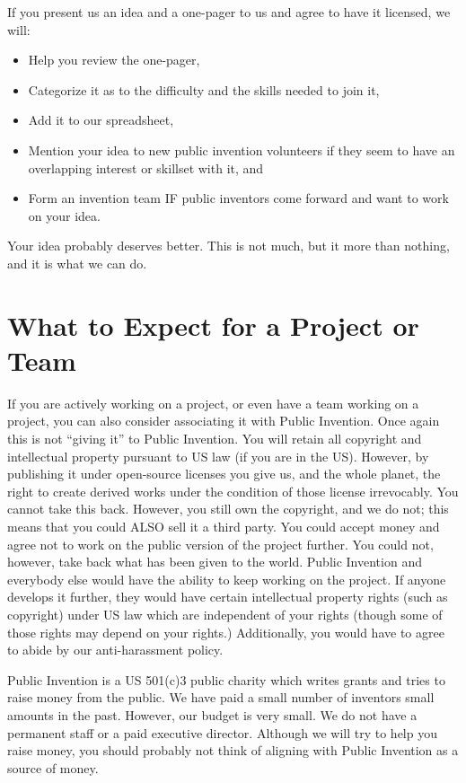 \documentclass[
	fontsize=10pt, %
	twoside=false, %
	secnumdepth=1, %
]{kaobook}
\begin{document}
If you present us an idea and a one-pager to us and agree to have it licensed, we will:
\begin{itemize}
\item Help you review the one-pager,
\item Categorize it as to the difficulty and the skills needed to join it,
\item Add it to our spreadsheet,
  \item Mention your idea to new public invention volunteers if they seem to have an overlapping interest or skillset with it, and
  \item Form an invention team IF public inventors come forward and want to work on your idea.
  \end{itemize}
Your idea probably deserves better. This is not much, but it more than nothing, and it is what we can do.

\section{What to Expect for a Project or Team}

If you are actively working on a project, or even have a team working on a project, you can also consider associating it with Public Invention.
Once again this is not ``giving it'' to Public Invention. You will retain all copyright and intellectual property pursuant to US law (if you are in the US).
However, by publishing it under open-source licenses you give us, and the whole planet, the right to create derived works under the condition of
those license irrevocably. You cannot take this back. However, you still own the copyright, and we do not; this means that you could ALSO sell it
a third party. You could accept money and agree not to work on the public version of the project further. You could not, however, take back what
has been given to the world. Public Invention and everybody else would have the ability to keep working on the project. If anyone develops it
further, they would have certain intellectual property rights (such as copyright) under US law which are independent of your rights (though some of
those rights may depend on your rights.) Additionally, you would have to agree to abide by our anti-harassment policy.

Public Invention is a US 501(c)3 public charity which writes grants and tries to raise money from the public.
We have paid a small number of inventors small amounts in the past. However, our budget is very small. We do not have a permanent staff or a paid executive
director. Although we will try to help you raise money, you should probably not think of aligning with Public Invention as a source of money.
\end{document}
